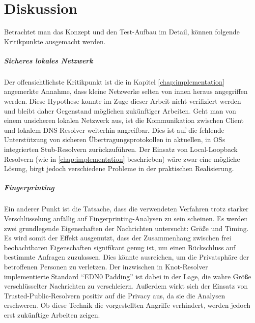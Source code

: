 \chapter{Diskussion}
Betrachtet man das Konzept und den Test-Aufbau im Detail, können folgende Kritikpunkte ausgemacht werden. 

\paragraph{Sicheres lokales Netzwerk}
Der offensichtlichste Kritikpunkt ist die in Kapitel \ref{chap:implementation} angemerkte Annahme, dass kleine Netzwerke selten von innen heraus angegriffen werden. Diese Hypothese konnte im Zuge dieser Arbeit nicht verifiziert werden und bleibt daher Gegenstand möglichen zukünftiger Arbeiten. Geht man von einem unsicheren lokalen Netzwerk aus, ist die Kommunikation zwischen Client und lokalem DNS-Resolver weiterhin angreifbar. Dies ist auf die fehlende Unterstützung von sicheren Übertragungsprotokollen in aktuellen, in \acp{OS} integrierten Stub-Resolvern zurückzuführen. Der Einsatz von Local-Loopback Resolvern (wie in \ref{chap:implementation} beschrieben) wäre zwar eine mögliche Lösung, birgt jedoch verschiedene Probleme in der praktischen Realisierung.

\paragraph{Fingerprinting}
Ein anderer Punkt ist die Tatsache, dass die verwendeten Verfahren trotz starker Verschlüsselung anfällig auf Fingerprinting-Analysen zu sein scheinen\cite{Shulman2014}\cite{Siby2018}. Es werden zwei grundlegende Eigenschaften der Nachrichten untersucht: Größe und Timing. Es wird somit der Effekt ausgenutzt, dass der Zusammenhang zwischen frei beobachtbaren Eigenschaften signifikant genug ist, um einen Rückschluss auf bestimmte Anfragen zuzulassen. Dies könnte ausreichen, um die Privatsphäre der betroffenen Personen zu verletzen. Der inzwischen in Knot-Resolver implementierte Standard ``EDN0 Padding''\cite{rfc7830} ist dabei in der Lage, die wahre Größe verschlüsselter Nachrichten zu verschleiern. Außerdem wirkt sich der Einsatz von Trusted-Public-Resolvern positiv auf die Privacy aus, da sie die Analysen erschweren\cite{Shulman2014}. Ob diese Technik die vorgestellten Angriffe verhindert, werden jedoch erst zukünftige Arbeiten zeigen. 


